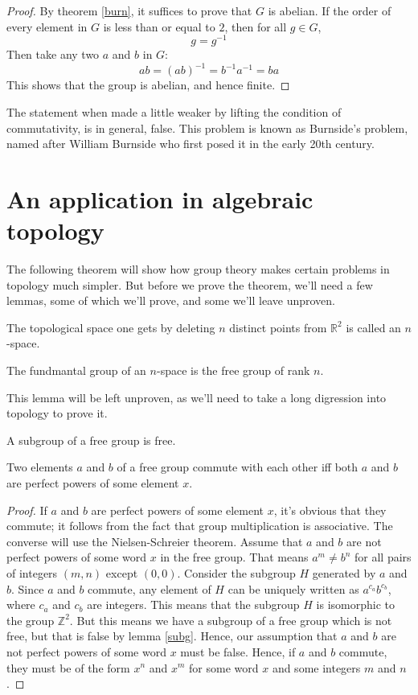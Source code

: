 \begin{proof}
By theorem \autoref{burn}, it suffices to prove that $G$ is abelian. If the order of every element in $G$ is less than or equal to $2$, then for all $g \in G$,
$$g=g^{-1}$$
Then take any two $a$ and $b$ in $G$:
$$ab = (ab)^{-1} = b^{-1}a^{-1} = ba$$
This shows that the group is abelian, and hence finite.
\end{proof}

The statement when made a little weaker by lifting the condition of commutativity, is in general, false. This problem is known as Burnside's problem, named after William Burnside who first posed it in the early 20th century.

\section{An application in algebraic topology}
The following theorem will show how group theory makes certain problems in topology much simpler. But before we prove the theorem, we'll need a few lemmas, some of which we'll prove, and some we'll leave unproven.

\begin{defn}
The topological space one gets by deleting $n$ distinct points from $\mathbb{R}^2$ is called an $n$-space.
\end{defn}

\begin{lem}
The fundmantal group of an $n$-space is the free group of rank $n$.
\end{lem}

This lemma will be left unproven, as we'll need to take a long digression into topology to prove it.

\begin{lem}\label{subg}
A subgroup of a free group is free.
\end{lem}

\begin{lem}\label{impo}
Two elements $a$ and $b$ of a free group commute with each other iff both $a$ and $b$ are perfect powers of some element $x$.
\end{lem}

\begin{proof}
If $a$ and $b$ are perfect powers of some element $x$, it's obvious that they commute; it follows from the fact that group multiplication is associative. The converse will use the Nielsen-Schreier theorem. Assume that $a$ and $b$ are not perfect powers of some word $x$ in the free group. That means $a^m \neq b^n$ for all pairs of integers $(m,n)$ except $(0,0)$. Consider the subgroup $H$ generated by $a$ and $b$. Since $a$ and $b$ commute, any element of $H$ can be uniquely written as $a^{c_a}b^{c_b}$, where $c_a$ and $c_b$ are integers. This means that the subgroup $H$ is isomorphic to the group $\mathbb{Z}^2$. But this means we have a subgroup of a free group which is not free, but that is false by lemma \autoref{subg}. Hence, our assumption that $a$ and $b$ are not perfect powers of some word $x$ must be false. Hence, if $a$ and $b$ commute, they must be of the form $x^n$ and $x^m$ for some word $x$ and some integers $m$ and $n$.
\end{proof}

